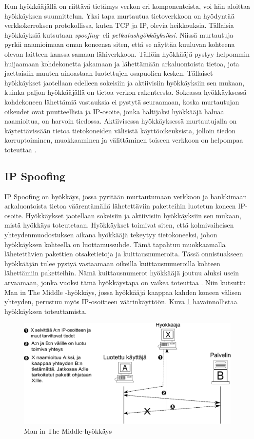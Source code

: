 Kun hyökkääjällä on riittävä tietämys verkon eri komponenteista, voi
hän aloittaa hyökkäyksen suunnittelun. Yksi tapa murtautua
tietoverkkoon on hyödyntää verkkokerroksen protokollissa, kuten TCP ja
IP, olevia heikkouksia. Tällaisia hyökkäyksiä kutsutaan
\textit{spoofing}- eli \textit{petkutushyökkäyksiksi}. Niissä
murtautuja pyrkii naamioimaan oman koneensa siten, että se näyttäa
kuuluvan kohteena olevan laitteen kanssa samaan lähiverkkoon.  Tällöin
hyökkääjä pystyy helpommin huijaamaan kohdekonetta jakamaan ja
lähettämään arkaluontoista tietoa, jota jaettaisiin muuten ainoastaan
luotettujen osapuolien kesken.  Tällaiset hyökkäykset jaotellaan
edelleen sokeisiin ja aktiivisiin hyökkäyksiin sen mukaan, kuinka
paljon hyökkääjällä on tietoa verkon rakenteesta. Sokeassa
hyökkäyksessä kohdekoneen lähettämiä vastauksia ei pystytä seuraamaan,
koska murtautujan oikeudet ovat puutteellisia ja IP-osoite, jonka
haltijaksi hyökkääjä haluaa naamioitua, on harvoin tiedossa.
Aktiivisessa hyökkäyksessä murtautujalla on käytettävissään tietoa
tietokoneiden välisistä käyttöoikeuksista, jolloin tiedon
korruptoiminen, muokkaaminen ja välittäminen toiseen verkkoon on
helpompaa toteuttaa \cite{WEBS}.

\subsection{IP Spoofing}

IP Spoofing on hyökkäys, jossa pyritään murtautumaan verkkoon ja
hankkimaan arkaluontoista tietoa väärentämällä lähetettäviin
paketteihin luotetun koneen IP-osoite. Hyökkäykset jaotellaan
sokeisiin ja aktiivisiin hyökkäyksiin sen mukaan, mistä hyökkäys
toteutetaan. Hyökkäykset toimivat siten, että kolmivaiheisen
yhteydenmuodostuksen aikana hyökkääjä tekeytyy tietokoneeksi, johon
hyökkäyksen kohteella on luottamussuhde. Tämä tapahtuu muokkaamalla
lähetettävien pakettien otsaketietoja ja kuittausnumeroita. Tässä
onnistuakseen hyökkääjän tulee pystyä vastaamaan oikeilla
kuittausnumeroilla kohteen lähettämiin paketteihin. Nämä
kuittausnumerot hyökkääjä joutuu aluksi usein arvaamaan, jonka vuoksi
tämä hyökkäystapa on vaikea toteuttaa \cite{WEBS}. Niin kutsuttu Man
in The Middle -hyökkäys, jossa hyökkääjä kaappaa kahden koneen välisen
yhteyden, perustuu myös IP-\-osoitteen väärinkäyttöön. Kuva \ref{Man}
havainnollistaa hyökkäyksen toteuttamista.

\begin{figure}[ht]
\centering
\includegraphics[width=13cm]{pics/MiTM.pdf}
\caption{Man in The Middle-hyökkäys}
\label{Man}
\end{figure}

